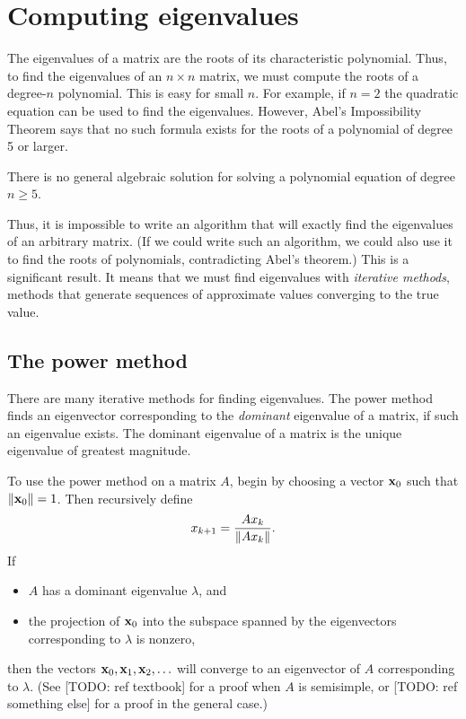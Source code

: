 \label{lab:EigSolve}

\section*{Computing eigenvalues}
The eigenvalues of a matrix are the roots of its characteristic polynomial. 
Thus, to find the eigenvalues of an $n \times n$ matrix, we must compute the roots of a degree-$n$ polynomial. 
This is easy for small $n$. 
For example, if $n=2$ the quadratic equation can be used to find the eigenvalues. 
However, Abel's Impossibility Theorem says that no such formula exists for the roots of a polynomial of degree 5 or larger.

\begin{theorem}
There is no general algebraic solution for solving a polynomial equation of degree $n\geq5$.
\label{thm:Abel}
\end{theorem}

Thus, it is impossible to write an algorithm that will exactly find the eigenvalues of an arbitrary matrix. 
(If we could write such an algorithm, we could also use it to find the roots of polynomials, contradicting Abel's theorem.) 
This is a significant result. 
It means that we must find eigenvalues with \emph{iterative methods}, methods that generate sequences of approximate values converging to the true value.

\subsection*{The power method}
There are many iterative methods for finding eigenvalues. 
The power method finds an eigenvector corresponding to the \emph{dominant} eigenvalue of a matrix, if such an eigenvalue exists.
The dominant eigenvalue of a matrix is the unique eigenvalue of greatest magnitude.

To use the power method on a matrix $A$, begin by choosing a vector ${\bf x}_0$ such that $\|{\bf x}_0\|=1$. Then recursively define
\[
x_{k+1}=\frac{Ax_k}{\left\lVert Ax_k\right\rVert}.
\]
If 
\begin{itemize}
\item $A$ has a dominant eigenvalue $\lambda$, and
\item the projection of ${\bf x}_0$ into the subspace spanned by the eigenvectors corresponding to $\lambda$ is nonzero,
\end{itemize}
then the vectors ${\bf x}_0, {\bf x}_1, {\bf x}_2, \ldots$ will converge to an eigenvector of $A$ corresponding to $\lambda$. 
(See [TODO: ref textbook] for a proof when $A$ is semisimple, or [TODO: ref something else] for a proof in the general case.)

